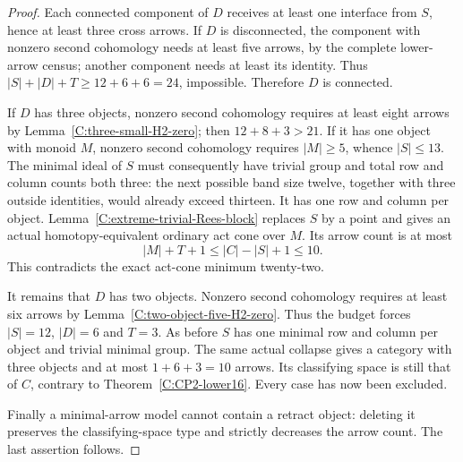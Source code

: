 \begin{proof}
Each connected component of $D$ receives at least one interface
from $S$, hence at least three cross arrows. If $D$ is disconnected,
the component with nonzero second cohomology needs at least five
arrows, by the complete lower-arrow census; another component
needs at least its identity. Thus
$|S|+|D|+T\geq12+6+6=24$, impossible. Therefore $D$ is connected.

If $D$ has three objects, nonzero second cohomology requires at
least eight arrows by Lemma~\ref{C:three-small-H2-zero}; then
$12+8+3>21$. If it has one object with monoid $M$, nonzero
second cohomology requires $|M|\geq5$, whence $|S|\leq13$.
The minimal ideal of $S$ must consequently have trivial group
and total row and column counts both three: the next possible
band size twelve, together with three outside identities, would
already exceed thirteen. It has one row and column per object.
Lemma~\ref{C:extreme-trivial-Rees-block} replaces $S$ by a point
and gives an actual homotopy-equivalent ordinary act cone over
$M$. Its arrow count is at most
\[
 |M|+T+1\leq |C|-|S|+1\leq10.
\]
This contradicts the exact act-cone minimum twenty-two.

It remains that $D$ has two objects. Nonzero second cohomology
requires at least six arrows by
Lemma~\ref{C:two-object-five-H2-zero}. Thus the budget forces
$|S|=12$, $|D|=6$ and $T=3$. As before $S$ has one minimal
row and column per object and trivial minimal group. The same
actual collapse gives a category with three objects and at most
$1+6+3=10$ arrows. Its classifying space is still that of $C$,
contrary to Theorem~\ref{C:CP2-lower16}.
Every case has now been excluded.

Finally a minimal-arrow model cannot contain a retract object:
deleting it preserves the classifying-space type and strictly
decreases the arrow count. The last assertion follows.
\end{proof}
